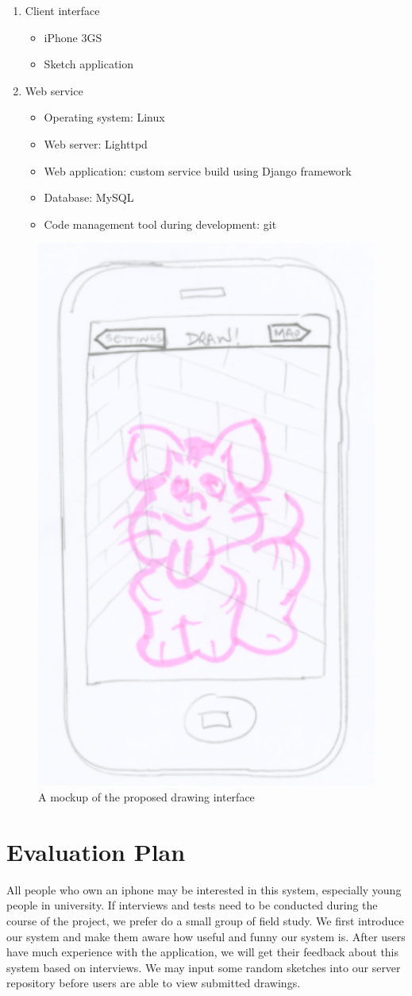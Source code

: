 \documentclass{www2010-submission}
\begin{document}
\begin{enumerate}
\item Client interface
        \begin{itemize}
        \item iPhone 3GS
        \item  Sketch application
        \end{itemize}

\item Web service
        \begin{itemize}
        \item Operating system: Linux
        \item Web server: Lighttpd
        \item Web application: custom service build using Django framework
        \item Database: MySQL
        \item Code management tool during development: git
        \end{itemize}
\end{enumerate}

\begin{figure}
\centering
\includegraphics[width=.35\textwidth]{draw.pdf}
\caption{A mockup of the proposed drawing interface}
\label{fig:draw}
\end{figure}

\section{ Evaluation Plan }

All people who own an iphone may be interested in this system, especially young
people in university. If interviews and tests need to be conducted during the
course of the project, we prefer do a small group of field study. We first
introduce our system and make them aware how useful and funny our system is.
After users have much experience with the application, we will get their
feedback about this system based on interviews. We may input some random
sketches into our server repository before users are able to view submitted
drawings.
\end{document}
